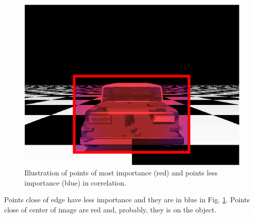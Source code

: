 \begin{figure}[H]
\includegraphics[width=\columnwidth]{images/imageErrorcontroled.eps}
\caption{Illustration of points of most importance (red) and points less importance (blue) in correlation.}
\label{fig:errorpondered}
\end{figure}

Points close of edge have less importance and they are in blue in Fig. \ref{fig:errorpondered}. 
Points close of center of image are red and, probably, they is on the object.